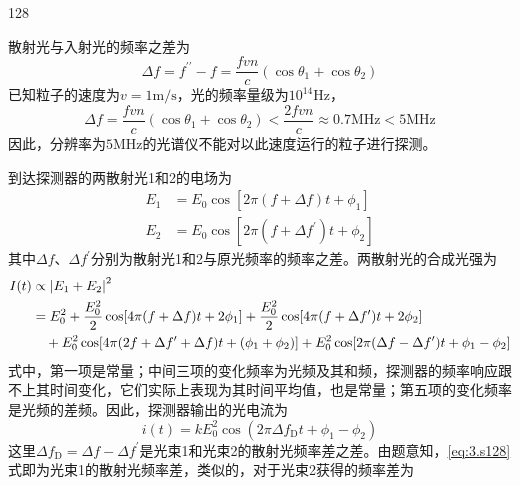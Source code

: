 \begin{solution}{128}
\begin{subsolution}
        散射光与入射光的频率之差为
        \begin{equation}
            \Delta f = f ^ {\prime \prime} - f = \frac {f v n}{c} (\cos \theta_ {1} + \cos \theta_ {2})
            \label{eq:3.s128}
        \end{equation}
        已知粒子的速度为$v=1\mathrm{m/s}$，光的频率量级为$10^{14}\mathrm{Hz}$，
        \begin{equation}
            \Delta f = \frac {f v n}{c} (\cos \theta_ {1} + \cos \theta_ {2}) < \frac {2 f v n}{c} \approx 0.7 \mathrm{MHz} < 5 \mathrm{MHz}
            \label{eq:4.s128}
        \end{equation}
        因此，分辨率为$5\mathrm{MHz}$的光谱仪不能对以此速度运行的粒子进行探测。
    \end{subsolution}
    \begin{subsolution}
        到达探测器的两散射光1和2的电场为
        \begin{align}
            E _ {1} &= E _ {0} \cos [ 2 \pi (f + \Delta f) t + \phi_ {1} ] \label{eq:5.s128} \\
            E _ {2} &= E _ {0} \cos [ 2 \pi (f + \Delta f ^ {\prime}) t + \phi_ {2} ] \label{eq:6.s128}
        \end{align}
        其中$\Delta f$、$\Delta f ^ { \prime }$分别为散射光1和2与原光频率的频率之差。两散射光的合成光强为
        \begin{align}
            I (t) &\propto \left| E _ {1} + E _ {2} \right| ^ {2} \notag \\
            &= E _ {0} ^ {2} + \frac {E _ {0} ^ {2}}{2} \cos [ 4 \pi (f + \Delta f) t + 2 \phi_ {1} ] + \frac {E _ {0} ^ {2}}{2} \cos [ 4 \pi (f + \Delta f ^ {\prime}) t + 2 \phi_ {2} ] \notag \\
            &\quad + E _ {0} ^ {2} \cos [ 4 \pi (2 f + \Delta f ^ {\prime} + \Delta f) t + (\phi_ {1} + \phi_ {2}) ] + E _ {0} ^ {2} \cos [ 2 \pi (\Delta f - \Delta f ^ {\prime}) t + \phi_ {1} - \phi_ {2} ]
            \label{eq:7.s128}
        \end{align}
        式中，第一项是常量；中间三项的变化频率为光频及其和频，探测器的频率响应跟不上其时间变化，它们实际上表现为其时间平均值，也是常量；第五项的变化频率是光频的差频。因此，探测器输出的光电流为
        \begin{equation}
            i (t) = k E _ {0} ^ {2} \cos (2 \pi \Delta f _ {\mathrm{D}} t + \phi_ {1} - \phi_ {2})
            \label{eq:8.s128}
        \end{equation}
        这里$\Delta f _ {\mathrm{D}} = \Delta f - \Delta f ^ {\prime}$是光束1和光束2的散射光频率差之差。由题意知，\eqref{eq:3.s128}式即为光束1的散射光频率差，类似的，对于光束2获得的频率差为

\end{subsolution}
\end{solution}
